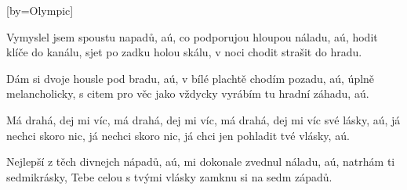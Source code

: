[by={Olympic}]

\beginverse{}
Vymyslel jsem spoustu napadů, aú,
co podporujou hloupou náladu, aú,
hodit klíče do kanálu, sjet po zadku holou skálu,
v noci chodit strašit do hradu.
\endverse{}

\beginverse{}
Dám si dvoje housle pod bradu, aú,
v bílé plachtě chodím pozadu, aú,
úplně melancholicky, s citem pro věc jako vždycky
vyrábím tu hradní záhadu, aú.
\endverse{}

\beginchorus{}
Má drahá, dej mi víc, má drahá, dej mi víc,
má drahá, dej mi víc své lásky, aú,
já nechci skoro nic, já nechci skoro nic,
já chci jen pohladit tvé vlásky, aú.
\endchorus{}

\beginverse{}
Nejlepší z těch divnejch nápadů, aú,
mi dokonale zvednul náladu, aú,
natrhám ti sedmikrásky, Tebe celou s tvými vlásky
zamknu si na sedm západů. 
\endverse{}

\endsong{}
